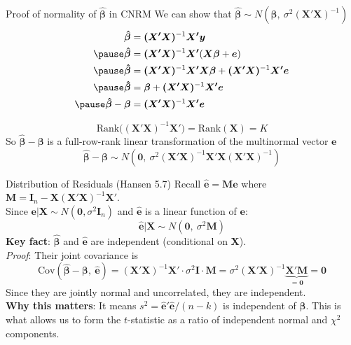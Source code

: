 \documentclass[aspectratio=169, handout, t]{beamer}
\numberwithin{equation}{section}
\begin{document}
\begin{frame}{Proof of normality of $\bm{\hat{\beta}}$ in CNRM}
We can show that $\bm{\hat{\beta}}\sim N(\bm{\beta},\ \sigma^2\bm{(X'X)}^{-1})$
\begin{align*}
\bm{\hat{\beta}}&=\bm{(X'X)}^{-1}\bm{X'}\bm{y}\\\pause
\bm{\hat{\beta}}&=\bm{(X'X)}^{-1}\bm{X'}(\bm{X}\bm{\beta}+\bm{e})\\\pause
\bm{\hat{\beta}}&=\bm{(X'X)}^{-1}\bm{X'}\bm{X}\bm{\beta}+\bm{(X'X)}^{-1}\bm{X'}\bm{e}\\\pause
\bm{\hat{\beta}}&=\bm{\beta}+\bm{(X'X)}^{-1}\bm{X'}\bm{e}\\\pause
\bm{\hat{\beta}}-\bm{\beta}&=\bm{(X'X)}^{-1}\bm{X'}\bm{e}
\end{align*}

$$\text{Rank}\bm{((X'X)}^{-1}\bm{X'})=\text{Rank}(\bm{X})=K$$
So $\bm{\hat{\beta}}-\bm{\beta}$ is a full-row-rank linear transformation of the multinormal vector $\bm{e}$
$$\bm{\hat{\beta}}-\bm{\beta} \sim N(\bm{0},\ \sigma^2\bm{(X'X)}^{-1}\bm{X'}\bm{X}\bm{(X'X)}^{-1})$$
\end{frame}



\begin{frame}{Distribution of Residuals (Hansen 5.7)}
Recall $\bm{\hat{e}}=\bm{Me}$ where $\bm{M}=\bm{I}_n-\bm{X}(\bm{X'X})^{-1}\bm{X'}$.\\\medskip
Since $\bm{e}|\bm{X}\sim N(\bm{0},\sigma^2\bm{I}_n)$ and $\bm{\hat{e}}$ is a linear function of $\bm{e}$:
$$\bm{\hat{e}}|\bm{X}\sim N(\bm{0},\ \sigma^2\bm{M})$$\pause
\medskip
\textbf{Key fact}: $\hat{\bm{\beta}}$ and $\hat{\bm{e}}$ are \alert{independent} (conditional on $\bm{X}$).\\[4pt]
\emph{Proof}: Their joint covariance is
$$\text{Cov}(\hat{\bm{\beta}}-\bm{\beta},\ \hat{\bm{e}})=(\bm{X'X})^{-1}\bm{X'}\cdot\sigma^2\bm{I}\cdot\bm{M}=\sigma^2(\bm{X'X})^{-1}\underbrace{\bm{X'M}}_{=\bm{0}}=\bm{0}$$
Since they are jointly normal and uncorrelated, they are independent.\\\pause
\medskip
\textbf{Why this matters}: It means $s^2=\hat{\bm{e}}'\hat{\bm{e}}/(n-k)$ is independent of $\hat{\bm{\beta}}$.  This is what allows us to form the $t$-statistic as a ratio of independent normal and $\chi^2$ components.
\end{frame}
\end{document}
